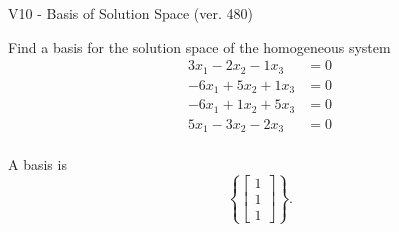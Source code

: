 \begin{exercise}
  \begin{exerciseTitle}V10 - Basis of Solution Space (ver. 480)\end{exerciseTitle}
  \begin{exerciseStatement}
    Find a basis for the solution space of the homogeneous system 
\begin{align*}
 3 x_ 1 -2 x_ 2 -1 x_ 3 &= 0  \\ 
  -6 x_ 1 + 5 x_ 2 + 1 x_ 3 &= 0  \\ 
  -6 x_ 1 + 1 x_ 2 + 5 x_ 3 &= 0  \\ 
  5 x_ 1 -3 x_ 2 -2 x_ 3 &= 0  \\ 
 \end{align*}


 
  \end{exerciseStatement}

  \begin{exerciseAnswer}
   A basis is   
\[\left\{\left[\begin{array}{c}
1 \\
1 \\
1
\end{array}\right]\right\}.\]

  


  \end{exerciseAnswer}
\end{exercise}
